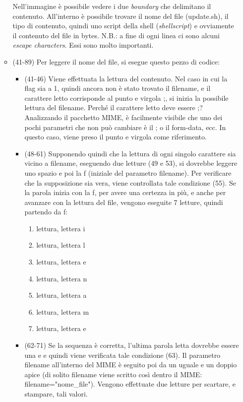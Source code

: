 \documentclass[a4paper]{article}
\begin{document}
\begin{itemize}
\begin{itemize}
			\noindent
			Nell'immagine è possibile vedere i due \emph{boundary} che delimitano il contenuto. All'interno è possibile trovare il nome del file (\textsf{update.sh}), il tipo di contenuto, quindi uno script della shell (\emph{shellscript}) e ovviamente il contenuto del file in bytes.\newline
			N.B.: a fine di ogni linea ci sono alcuni \emph{escape characters}. Essi sono molto importanti.
			
			\item (41-89) Per leggere il nome del file, si esegue questo pezzo di codice:
			\begin{itemize}
				\item (41-46) Viene effettuata la lettura del contenuto. Nel caso in cui la \textsf{flag} sia a 1, quindi ancora non è stato trovato il \textsf{filename}, e il carattere letto corrisponde al punto e virgola \textsf{;}, si inizia la possibile lettura del \textsf{filename}.\newline
				Perché il carattere letto deve essere \textsf{;}? Analizzando il pacchetto MIME, è facilmente visibile che uno dei pochi parametri che non può cambiare è il \textsf{;} o il \textsf{form-data}, ecc. In questo caso, viene preso il punto e virgola come riferimento.
				
				\item (48-61) Supponendo quindi che la lettura di ogni singolo carattere sia vicino a \textsf{filename}, eseguendo due letture (49 e 53), si dovrebbe leggere uno spazio e poi la \textsf{f} (iniziale del parametro \textsf{filename}). Per verificare che la supposizione sia vera, viene controllata tale condizione (55). Se la parola inizia con la \textsf{f}, per avere una certezza in più, e anche per avanzare con la lettura del file, vengono eseguite 7 letture, quindi partendo da \textsf{f}:
				\begin{enumerate}
					\item lettura, lettera \textsf{i}
					\item lettura, lettera \textsf{l}
					\item lettura, lettera \textsf{e}
					\item lettura, lettera \textsf{n}
					\item lettura, lettera \textsf{a}
					\item lettura, lettera \textsf{m}
					\item lettura, lettera \textsf{e}
				\end{enumerate}
				
				\item (62-71) Se la sequenza è corretta, l'ultima parola letta dovrebbe essere una \textsf{e} e quindi viene verificata tale condizione (63). Il parametro \textsf{filename} all'interno del MIME è seguito poi da un uguale e un doppio apice (di solito \textsf{filename} viene scritto così dentro il MIME: \textsf{filename="nome\_file"}). Vengono effettuate due letture per scartare, e stampare, tali valori.
				

\end{itemize}
\end{itemize}
\end{itemize}
\end{document}
